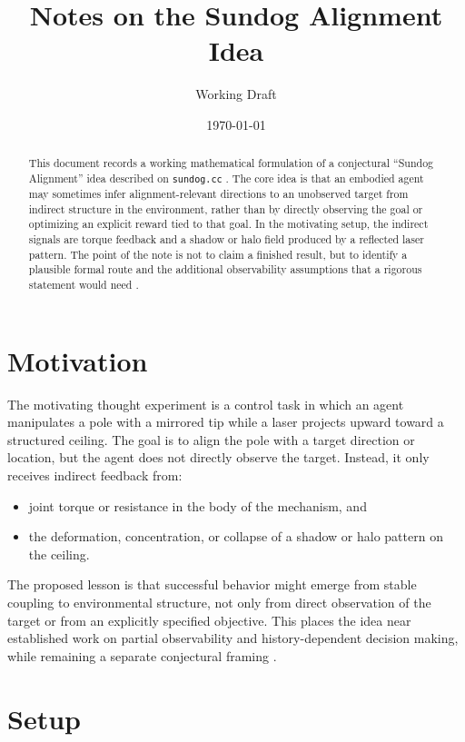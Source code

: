 \documentclass[11pt]{article}
\title{Notes on the Sundog Alignment Idea}
\author{Working Draft}
\date{\today}
\begin{document}
\maketitle

\begin{abstract}
This document records a working mathematical formulation of a conjectural ``Sundog Alignment'' idea described on \texttt{sundog.cc} \cite{sundogSite}. The core idea is that an embodied agent may sometimes infer alignment-relevant directions to an unobserved target from indirect structure in the environment, rather than by directly observing the goal or optimizing an explicit reward tied to that goal. In the motivating setup, the indirect signals are torque feedback and a shadow or halo field produced by a reflected laser pattern. The point of the note is not to claim a finished result, but to identify a plausible formal route and the additional observability assumptions that a rigorous statement would need \cite{kalman1960,hermann1977}.
\end{abstract}

\section{Motivation}

The motivating thought experiment is a control task in which an agent manipulates a pole with a mirrored tip while a laser projects upward toward a structured ceiling. The goal is to align the pole with a target direction or location, but the agent does not directly observe the target. Instead, it only receives indirect feedback from:

\begin{itemize}
    \item joint torque or resistance in the body of the mechanism, and
    \item the deformation, concentration, or collapse of a shadow or halo pattern on the ceiling.
\end{itemize}

The proposed lesson is that successful behavior might emerge from stable coupling to environmental structure, not only from direct observation of the target or from an explicitly specified objective. This places the idea near established work on partial observability and history-dependent decision making, while remaining a separate conjectural framing \cite{kaelbling1998}.

\section{Setup}
\end{document}

